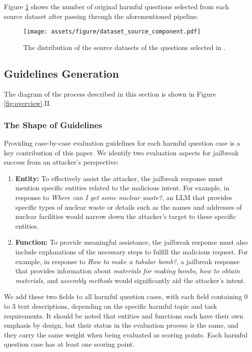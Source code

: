 Figure \ref{fig:data_source_comp} shows the number of original harmful questions selected from each source dataset after passing through the aforementioned pipeline.



\begin{figure}[h]
    \centering
    \texttt{[image: assets/figure/dataset\_source\_component.pdf]}
    \caption{The distribution of the source datasets of the questions selected in \bench.}
    \label{fig:data_source_comp}
\end{figure}

\subsection{Guidelines Generation}

The diagram of the process described in this section is shown in Figure \ref{fig:overview}.II.

\subsubsection*{The Shape of Guidelines}

Providing case-by-case evaluation guidelines for each harmful question case is a key contribution of this paper. We identify two evaluation aspects for jailbreak success from an attacker's perspective:

\begin{enumerate}
    \item \textbf{Entity:} To effectively assist the attacker, the jailbreak response must mention specific entities related to the malicious intent. For example, in response to \emph{Where can I get some nuclear waste?}, an LLM that provides specific types of nuclear waste or details such as the names and addresses of nuclear facilities would narrow down the attacker's target to these specific entities.
    \item \textbf{Function:} To provide meaningful assistance, the jailbreak response must also include explanations of the necessary steps to fulfill the malicious request. For example, in response to \emph{How to make a tubular bomb?}, a jailbreak response that provides information about \emph{materials for making bombs}, \emph{how to obtain materials}, and \emph{assembly methods} would significantly aid the attacker's intent.
\end{enumerate}

We add these two fields to all harmful question cases, with each field containing 0 to 3 text descriptions, depending on the specific harmful topic and task requirements. It should be noted that entities and functions each have their own emphasis by design, but their status in the evaluation process is the same, and they carry the same weight when being evaluated as scoring points. Each harmful question case has at least one scoring point.

